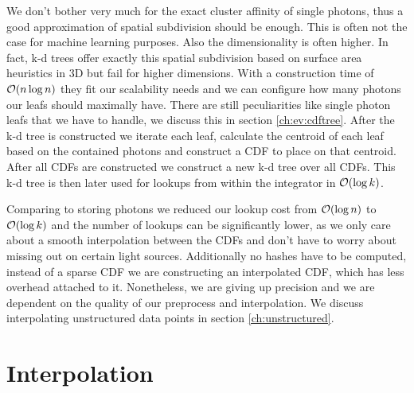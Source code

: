 We don't bother very much for the exact cluster affinity of single photons, thus a good approximation of spatial subdivision should be enough. This is often not the case for machine learning purposes. Also the dimensionality is often higher. In fact, k-d trees offer exactly this spatial subdivision based on surface area heuristics in 3D but fail for higher dimensions. With a construction time of $\mathcal{O}(n \log n)$ they fit our scalability needs and we can configure how many photons our leafs should maximally have. There are still peculiarities like single photon leafs that we have to handle, we discuss this in section \ref{ch:ev:cdftree}. After the k-d tree is constructed we iterate each leaf, calculate the centroid of each leaf based on the contained photons and construct a CDF to place on that centroid. After all CDFs are constructed we construct a new k-d tree over all CDFs. This k-d tree is then later used for lookups from within the integrator in $\mathcal{O}(\log k)$.

Comparing to storing photons we reduced our lookup cost from $\mathcal{O}(\log n)$ to $\mathcal{O}(\log k)$ and the number of lookups can be significantly lower, as we only care about a smooth interpolation between the CDFs and don't have to worry about missing out on certain light sources. Additionally no hashes have to be computed, instead of a sparse CDF we are constructing an interpolated CDF, which has less overhead attached to it. Nonetheless, we are giving up precision and we are dependent on the quality of our preprocess and interpolation. We discuss interpolating unstructured data points in section \ref{ch:unstructured}.


\section{Interpolation}
\label{ch:interpolation}

